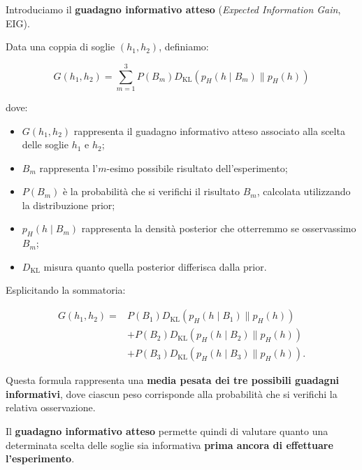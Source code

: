 Introduciamo il \textbf{guadagno informativo atteso} (\textit{Expected Information Gain}, EIG).

Data una coppia di soglie $(h_1,h_2)$, definiamo:

\begin{equation*}
    \boxed{
    G(h_1,h_2)
    =
    \sum_{m=1}^{3}
    P(B_m)
    D_{\mathrm{KL}}
    \left(
        p_H(h \mid B_m)
        \|
        p_H(h)
    \right)
    }
\end{equation*}

dove:

\begin{itemize}
    \item $G(h_1,h_2)$ rappresenta il guadagno informativo atteso associato alla scelta delle soglie $h_1$ e $h_2$;

    \item $B_m$ rappresenta l'$m$-esimo possibile risultato dell'esperimento;

    \item $P(B_m)$ è la probabilità che si verifichi il risultato $B_m$, calcolata utilizzando la distribuzione prior;

    \item $p_H(h\mid B_m)$ rappresenta la densità posterior che otterremmo se osservassimo $B_m$;

    \item $D_{\mathrm{KL}}$ misura quanto quella posterior differisca dalla prior.
\end{itemize}

Esplicitando la sommatoria:

\begin{align*}
    G(h_1,h_2)
    ={}&
    P(B_1)
    D_{\mathrm{KL}}
    \left(
        p_H(h \mid B_1)\|p_H(h)
    \right)
    \\
    &+
    P(B_2)
    D_{\mathrm{KL}}
    \left(
        p_H(h \mid B_2)\|p_H(h)
    \right)
    \\
    &+
    P(B_3)
    D_{\mathrm{KL}}
    \left(
        p_H(h\mid B_3)\|p_H(h)
    \right).
\end{align*}

Questa formula rappresenta una \textbf{media pesata dei tre possibili guadagni informativi}, dove ciascun peso corrisponde alla probabilità che si verifichi la relativa osservazione.


Il \textbf{guadagno informativo atteso} permette quindi di valutare
quanto una determinata scelta delle soglie sia informativa
\textbf{prima ancora di effettuare l'esperimento}.

